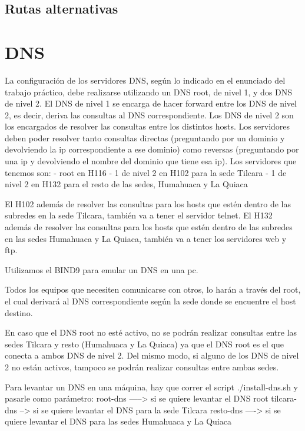 \documentclass[12pt,titlepage]{article}
\begin{document}
\subsection{Rutas alternativas}




\section{DNS}
La configuración de los servidores DNS, según lo indicado en el enunciado del trabajo práctico, debe realizarse utilizando un DNS root, de nivel 1, y dos DNS de nivel 2. 
El DNS de nivel 1 se encarga de hacer forward entre los DNS de nivel 2, es decir, deriva las consultas al DNS correspondiente.
Los DNS de nivel 2 son los encargados de resolver las consultas entre los distintos hosts.
Los servidores deben poder resolver tanto consultas directas (preguntando por un dominio y devolviendo la ip correspondiente a ese dominio) como reversas (preguntando por una ip y devolviendo el nombre del dominio que tiene esa ip).
Los servidores que tenemos son:
	- root en H116
	- 1 de nivel 2 en H102 para la sede Tilcara
	- 1 de nivel 2 en H132 para el resto de las sedes, Humahuaca y La Quiaca

El H102 además de resolver las consultas para los hosts que estén dentro de las subredes en la sede Tilcara, también va a tener el servidor telnet.
El H132 además de resolver las consultas para los hosts que estén dentro de las subredes en las sedes Humahuaca y La Quiaca, también va a tener los servidores web y ftp.


Utilizamos el BIND9 para emular un DNS en una pc.

Todos los equipos que necesiten comunicarse con otros, lo harán a través del root, el cual derivará al DNS correspondiente según la sede donde se encuentre el host destino.

En caso que el DNS root no esté activo, no se podrán realizar consultas entre las sedes Tilcara y resto (Humahuaca y La Quiaca) ya que el DNS root es el que conecta a ambos DNS de nivel 2.
Del mismo modo, si alguno de los DNS de nivel 2 no están activos, tampoco se podrán realizar consultas entre ambas sedes.

Para levantar un DNS en una máquina, hay que correr el script ./install-dns.sh y pasarle como parámetro:
	root-dns ----->	si se quiere levantar el DNS root
	tilcara-dns --> si se quiere levantar el DNS para la sede Tilcara
	resto-dns ---->	si se quiere levantar el DNS para las sedes Humahuaca y La Quiaca
\end{document}
